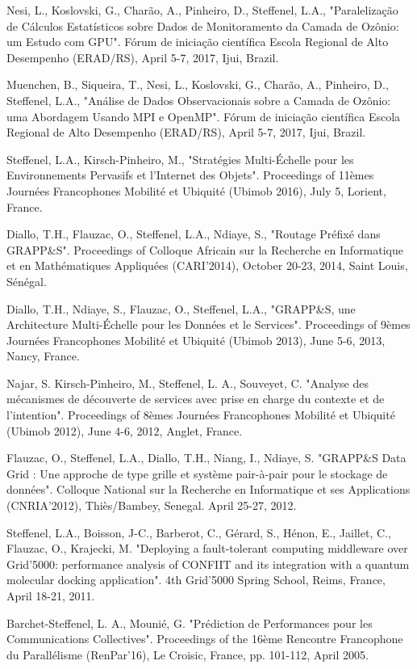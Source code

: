 \documentclass[final,twoside]{hdr} %
\begin{document}
Nesi, L., Koslovski, G., Charão, A., Pinheiro, D., Steffenel, L.A., "Paralelização de Cálculos Estatísticos sobre Dados de Monitoramento da Camada de Ozônio: um Estudo com GPU". Fórum de iniciação científica Escola Regional de Alto Desempenho (ERAD/RS), April 5-7, 2017, Ijui, Brazil.

Muenchen, B., Siqueira, T., Nesi, L., Koslovski, G., Charão, A., Pinheiro, D., Steffenel, L.A., "Análise de Dados Observacionais sobre a Camada de Ozônio: uma Abordagem Usando MPI e OpenMP". Fórum de iniciação científica Escola Regional de Alto Desempenho (ERAD/RS), April 5-7, 2017, Ijui, Brazil.

Steffenel, L.A., Kirsch-Pinheiro, M., "Stratégies Multi-Échelle pour les Environnements Pervasifs et l’Internet des Objets". Proceedings of 11èmes Journées Francophones Mobilité et Ubiquité (Ubimob 2016), July 5, Lorient, France.

Diallo, T.H., Flauzac, O., Steffenel, L.A., Ndiaye, S., "Routage Préfixé dans GRAPP\&S". Proceedings of Colloque Africain sur la Recherche en Informatique et en Mathématiques Appliquées (CARI'2014), October 20-23, 2014, Saint Louis, Sénégal.

Diallo, T.H., Ndiaye, S., Flauzac, O., Steffenel, L.A., "GRAPP\&S, une Architecture Multi-Échelle pour les Données et le Services". Proceedings of 9èmes Journées Francophones Mobilité et Ubiquité (Ubimob 2013), June 5-6, 2013, Nancy, France. 

Najar, S. Kirsch-Pinheiro, M., Steffenel, L. A., Souveyet, C. "Analyse des mécanismes de découverte de services avec prise en charge du contexte et de l'intention". Proceedings of 8èmes Journées Francophones Mobilité et Ubiquité (Ubimob 2012), June 4-6, 2012, Anglet, France. 

Flauzac, O., Steffenel, L.A., Diallo, T.H., Niang, I., Ndiaye, S. "GRAPP\&S Data Grid : Une approche de type grille et système pair-à-pair pour le stockage de données". Colloque National sur la Recherche en Informatique et ses Applications (CNRIA'2012), Thiès/Bambey, Senegal. April 25-27, 2012.

Steffenel, L.A., Boisson, J-C., Barberot, C., Gérard, S., Hénon, E., Jaillet, C., Flauzac, O., Krajecki, M. "Deploying a fault-tolerant computing middleware over Grid’5000: performance analysis of CONFIIT and its integration with a quantum molecular docking application". 4th Grid'5000 Spring School, Reims, France, April 18-21, 2011. 

Barchet-Steffenel, L. A., Mounié, G. "Prédiction de Performances pour les Communications Collectives". Proceedings of the 16ème Rencontre Francophone du Parallélisme (RenPar'16), Le Croisic, France, pp. 101-112, April 2005. 
\end{document}
